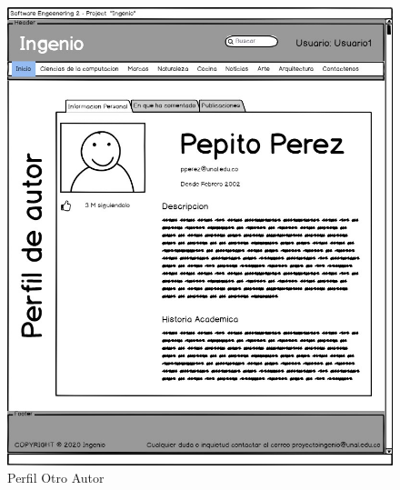 \documentclass[a4paper,12 pt]{article}
\begin{document}
\begin{figure}[H]
    \centering
    \includegraphics[scale = 1.4]{images/PerfilOtroAutor.jpg}
    \caption{Perfil Otro Autor}
    \label{F108}
\end{figure}{}
\end{document}
